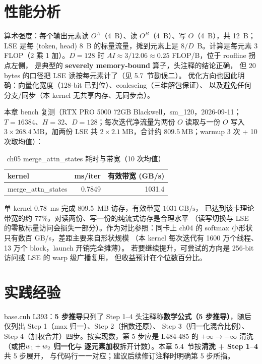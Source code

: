 \section{性能分析}

算术强度：每个输出元素读 $O^{A}$（4~B）、读 $O^{B}$（4~B）、写
$O$（4~B），共 12~B；LSE 是每 (token, head) 8~B 的标量流量，摊到元素上是
$8/D$~B。计算是每元素 3 FLOP（2 乘 1 加）。$D = 128$ 时
$AI \approx 3 / 12.06 \approx 0.25$ FLOP/B，位于 roofline 拐点左侧，
是典型的 \textbf{severely memory-bound} 算子，头注释的结论正确，
但 20 bytes 的口径把 LSE 读按每元素计了（见 5.7~节勘误二）。
优化方向也因此明确：向量化宽度（128-bit 已到位）、coalescing（三维解包保证）、
以及避免任何分支/同步（本 kernel 无共享内存、无同步点）。

本章 bench 复测（RTX PRO 5000 72GB Blackwell，sm\_120，2026-09-11；
$T = 16384$、$H = 32$、$D = 128$；每次迭代净流量为两份 $O$ 读取与一份 $O$ 写入
$3 \times 268.4~\text{MB}$，加两份 LSE 共 $2 \times 2.1~\text{MB}$，合计约
$809.5~\text{MB}$；warmup 3 次 + 10 次取均值）：

\begin{table}[htbp]
\centering
\caption{ch05 merge\_attn\_states 耗时与带宽（10 次均值）}
\label{tab:5-bench}
\begin{tabular}{lrr}
\toprule
kernel & ms/iter & 有效带宽 (GB/s) \\
\midrule
merge\_attn\_states & 0.7849 & 1031.4 \\
\bottomrule
\end{tabular}
\end{table}

单 kernel 0.78~ms 完成 809.5~MB 访存，有效带宽 $1031~\text{GB/s}$，
已达到该卡理论带宽的约 77\%，对读两份、写一份的纯流式访存是合理水平
（读写切换与 LSE 的零散标量访问会损失一部分）。作为对比参照：同卡上
ch04 的 softmax 小形状只有数百 GB/s，差距主要来自形状规模
（本 kernel 每次迭代有 1600 万个线程、13 万个 block，launch 开销完全摊薄）。
若要继续提升，可尝试的方向是 256-bit 访问或 LSE 的 warp 级广播复用，
但收益预计在个位数百分比。

\section{实践经验}

\begin{kaogu}[F3]{base.cuh L393：\textbf{5 步推导}只列了 Step 1--4}
  头注释称\textbf{数学公式（5 步推导）}，随后仅列出 Step 1（max 归一）、Step 2（指数还原）、
  Step 3（归一化混合比例）、Step 4（加权合并）四步。按实现数，第 5 步应是
  L484-485 的 $+\infty \to -\infty$ 清洗（或把\textbf{$w\sb{1} + w\sb{2}$ 归一化}与
  \textbf{逐元素加权}拆开计数）。本章 5.4~节按\textbf{清洗 + Step 1--4}共 5 步展开，
  与代码行一一对应；建议后续修订注释时明确第 5 步所指。
\end{kaogu}

